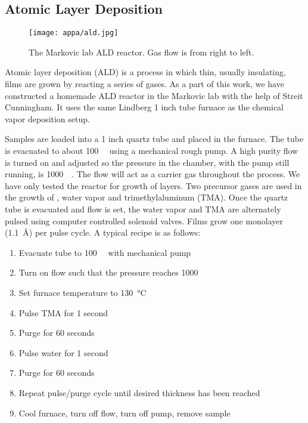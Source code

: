 \subsection{Atomic Layer Deposition}
\label{subsec:ald}

\begin{figure}
	\centering
	\texttt{[image: appa/ald.jpg]}
	\caption{The Markovic lab ALD reactor. Gas flow is from right to left.} 
	\label{fig:ald}
\end{figure}

Atomic layer deposition (ALD) is a process in which thin, usually insulating, films are grown by reacting a series of gases. As a part of this work, we have constructed a homemade ALD reactor in the Markovic lab with the help of Streit Cunningham. It uses the same Lindberg 1 inch tube furnace as the chemical vapor deposition setup.

Samples are loaded into a 1 inch quartz tube and placed in the furnace. The tube is evacuated to about \SI{100}{\milli\torr} using a mechanical rough pump. A high purity  flow is turned on and adjusted so the pressure in the chamber, with the pump still running, is \SI{1000}{\milli\torr}. The  flow will act as a carrier gas throughout the process. We have only tested the reactor for growth of  layers. Two precursor gases are used in the growth of , water vapor and trimethylaluminum (TMA). Once the quartz tube is evacuated and  flow is set, the water vapor and TMA are alternately pulsed using computer controlled solenoid valves. Films grow one monolayer (\SI{1.1}{\angstrom}) per pulse cycle. A typical recipe is as follows:

\begin{enumerate}
\item Evacuate tube to \SI{100}{\milli\torr} with mechanical pump
\item Turn on  flow such that the pressure reaches \SI{1000}{\milli\torr}
\item Set furnace temperature to \SI{130}{\degreeCelsius}
\item Pulse TMA for 1 second
\item Purge for 60 seconds
\item Pulse water for 1 second
\item Purge for 60 seconds
\item Repeat pulse\slash purge cycle until desired thickness has been reached
\item Cool furnace, turn off  flow, turn off pump, remove sample
\end{enumerate}

